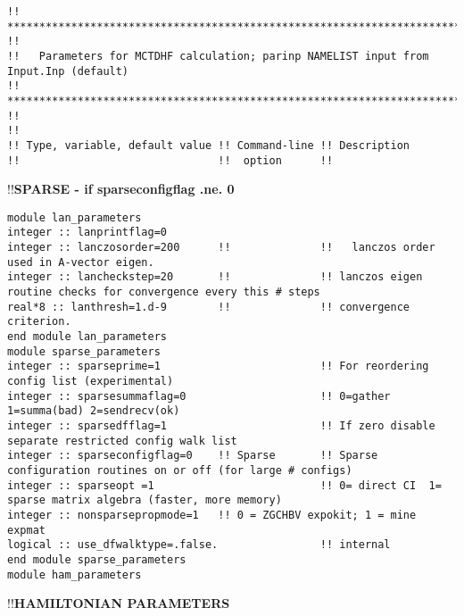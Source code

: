 \begin{verbatim}
!! *********************************************************************************************************** !!
!!   Parameters for MCTDHF calculation; parinp NAMELIST input from Input.Inp (default)
!! *********************************************************************************************************** !!
!!
!! Type, variable, default value !! Command-line !! Description 
!!                               !!  option      !! 
\end{verbatim}
!!\textbf{\qquad SPARSE - if sparseconfigflag .ne. 0}
\begin{verbatim}
module lan_parameters
integer :: lanprintflag=0
integer :: lanczosorder=200      !!              !!   lanczos order used in A-vector eigen.
integer :: lancheckstep=20       !!              !! lanczos eigen routine checks for convergence every this # steps
real*8 :: lanthresh=1.d-9        !!              !! convergence criterion.
end module lan_parameters
module sparse_parameters
integer :: sparseprime=1                         !! For reordering config list (experimental)
integer :: sparsesummaflag=0                     !! 0=gather 1=summa(bad) 2=sendrecv(ok)
integer :: sparsedfflag=1                        !! If zero disable separate restricted config walk list
integer :: sparseconfigflag=0    !! Sparse       !! Sparse configuration routines on or off (for large # configs)
integer :: sparseopt =1                          !! 0= direct CI  1= sparse matrix algebra (faster, more memory)
integer :: nonsparsepropmode=1   !! 0 = ZGCHBV expokit; 1 = mine expmat
logical :: use_dfwalktype=.false.                !! internal
end module sparse_parameters
module ham_parameters
\end{verbatim}
!!\textbf{\qquad HAMILTONIAN PARAMETERS}

